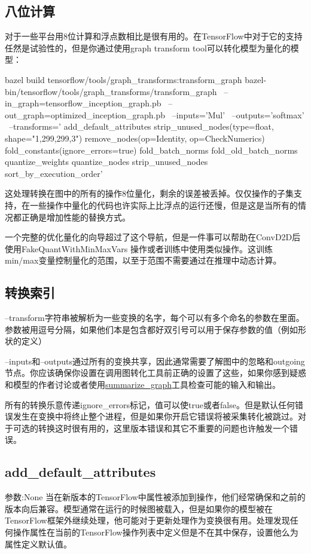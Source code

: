 \subsection{八位计算}
对于一些平台用8位计算和浮点数相比是很有用的。在TensorFlow中对于它的支持任然是试验性的，但是你通过使用graph transform tool可以转化模型为量化的模型：
\begin{bashcode}
bazel build tensorflow/tools/graph_transforms:transform_graph
bazel-bin/tensorflow/tools/graph_transforms/transform_graph \
--in_graph=tensorflow_inception_graph.pb \
--out_graph=optimized_inception_graph.pb \
--inputs='Mul' \
--outputs='softmax' \
--transforms='
  add_default_attributes
  strip_unused_nodes(type=float, shape="1,299,299,3")
  remove_nodes(op=Identity, op=CheckNumerics)
  fold_constants(ignore_errors=true)
  fold_batch_norms
  fold_old_batch_norms
  quantize_weights
  quantize_nodes
  strip_unused_nodes
  sort_by_execution_order'
\end{bashcode}
这处理转换在图中的所有的操作8位量化，剩余的误差被丢掉。仅仅操作的子集支持，在一些操作中量化的代码也许实际上比浮点的运行还慢，但是这是当所有的情况都正确是增加性能的替换方式。

一个完整的优化量化的向导超过了这个导航，但是一件事可以帮助在ConvD2D后使用FakeQuantWithMinMaxVars 操作或者训练中使用类似操作。这训练min/max变量控制量化的范围，以至于范围不需要通过在推理中动态计算。
\subsection{转换索引}
--transform字符串被解析为一些变换的名字，每个可以有多个命名的参数在里面。参数被用逗号分隔，如果他们本是包含都好双引号可以用于保存参数的值（例如形状的定义）

--inputs和--outputs通过所有的变换共享，因此通常需要了解图中的忽略和outgoing节点。你应该确保你设置在调用图转化工具前正确的设置了这些，如果你感到疑惑和模型的作者讨论或者使用\href{https://github.com/tensorflow/tensorflow/tree/master/tensorflow/tools/graph_transforms#inspecting-graphs}{summarize\_graph}工具检查可能的输入和输出。

所有的转换乐意传递ignore\_errors标记，值可以使true或者false。但是默认任何错误发生在变换中将终止整个进程，但是如果你开启它错误将被采集转化被跳过。对于可选的转换这时很有用的，这里版本错误和其它不重要的问题也许触发一个错误。
\subsection{add\_default\_attributes}
参数:None
当在新版本的TensorFlow中属性被添加到操作，他们经常确保和之前的版本向后兼容。模型通常在运行的时候图被载入，但是如果你的模型被在TensorFlow框架外继续处理，他可能对于更新处理作为变换很有用。处理发现任何操作属性在当前的TensorFlow操作列表中定义但是不在其中保存，设置他么为属性定义默认值。
